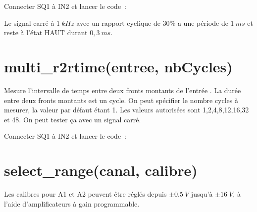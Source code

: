 \documentclass[a4paper,12pt,french]{sphinxmanual}
\begin{document}
Connecter SQ1 à IN2 et lancer le code :

\begin{sphinxVerbatim}[commandchars=\\\{\}]
 
  
\end{sphinxVerbatim}


Le signal carré à \(1~kHz\) avec un rapport cyclique de 30\% a une
période de \(1~ms\) et reste à l’état HAUT durant \(0,3~ms\).


\section{multi\_r2rtime(entree, nbCycles)}
\label{\detokenize{9.0:multi-r2rtime-entree-nbcycles}}
Mesure l’intervalle de temps entre deux fronts montants de l’entrée
. La durée entre deux fronts montants est un cycle.
On peut spécifier le nombre cycles à mesurer, la valeur par défaut
étant 1. Les valeurs autorisées sont 1,2,4,8,12,16,32 et 48. On peut
tester ça avec un signal carré.

Connecter SQ1 à IN2 et lancer le code :

\begin{sphinxVerbatim}[commandchars=\\\{\}]
  
\end{sphinxVerbatim}



\section{select\_range(canal, calibre)}
\label{\detokenize{9.0:select-range-canal-calibre}}
Les calibres pour A1 et A2 peuvent être réglés depuis \(\pm0.5~V\)
jusqu’à \(\pm16~V\), à l’aide d’amplificateurs à gain programmable.

\begin{sphinxVerbatim}[commandchars=\\\{\}]
          
          
\end{sphinxVerbatim}
\end{document}
